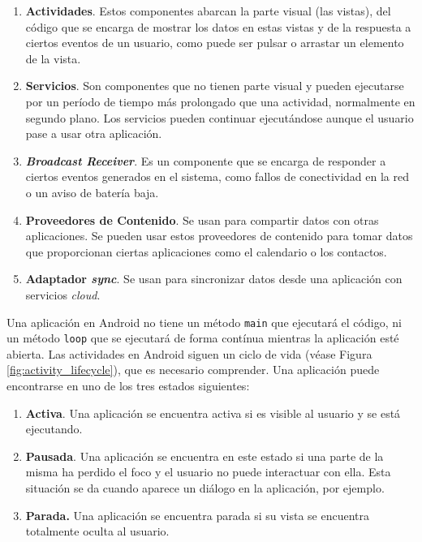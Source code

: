 \begin{enumerate}
\item \textbf{Actividades}. Estos componentes abarcan la parte visual (las vistas), del código que se encarga de mostrar los datos en estas vistas y de la respuesta a ciertos eventos de un usuario, como puede ser pulsar o arrastar un elemento de la vista.

\item \textbf{Servicios}. Son componentes que no tienen parte visual y pueden ejecutarse por un período de tiempo más prolongado que una actividad, normalmente en segundo plano. Los servicios pueden continuar ejecutándose aunque el usuario pase a usar otra aplicación.

\item \textbf{\textit{Broadcast Receiver}}. Es un componente que se encarga de responder a ciertos eventos generados en el sistema, como fallos de conectividad en la red o un aviso de batería baja. 	

\item \textbf{Proveedores de Contenido}. Se usan para compartir datos con otras aplicaciones. Se pueden usar estos proveedores de contenido para tomar datos que proporcionan ciertas aplicaciones como el calendario o los contactos. 

\item \textbf{Adaptador \textit{sync}}. Se usan para sincronizar datos desde una aplicación con servicios \textit{cloud}. 
\end{enumerate}

Una aplicación en Android no tiene un método \texttt{main} que ejecutará el código, ni un método \texttt{loop} que se ejecutará de forma contínua mientras la aplicación esté abierta. Las actividades en Android siguen un ciclo de vida (véase Figura \ref{fig:activity_lifecycle}), que es necesario comprender. Una aplicación puede encontrarse en uno de los tres estados siguientes:

\begin{enumerate}
\item \textbf{Activa}. Una aplicación se encuentra activa si es visible al usuario y se está ejecutando.
\item \textbf{Pausada}. Una aplicación se encuentra en este estado si una parte de la misma ha perdido el foco y el usuario no puede interactuar con ella. Esta situación se da cuando aparece un diálogo en la aplicación, por ejemplo.
\item \textbf{Parada.} Una aplicación se encuentra parada si su vista se encuentra totalmente oculta al usuario.
\end{enumerate}


